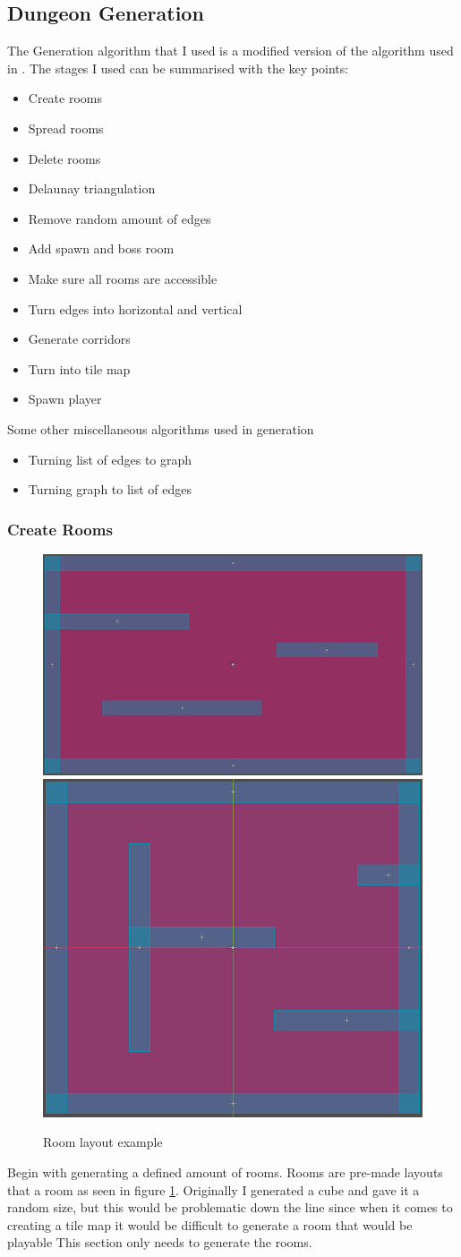 \documentclass{article}
\begin{document}
\subsection{Dungeon Generation}
The Generation algorithm that I used is a modified version of the algorithm used in {\cite{Gen_Alg}}. The stages I used can be summarised with the key points:
\begin{itemize}
\item{Create rooms}
\item{Spread rooms}
\item{Delete rooms}
\item{Delaunay triangulation}
\item{Remove random amount of edges}
\item{Add spawn and boss room}
\item{Make sure all rooms are accessible}
\item{Turn edges into horizontal and vertical}
\item{Generate corridors}
\item{Turn into tile map}
\item{Spawn player}
\end{itemize}
Some other miscellaneous algorithms used in generation
\begin{itemize}
\item{Turning list of edges to graph}
\item{Turning graph to list of edges}
\end{itemize}

\subsubsection{Create Rooms}
\begin{figure}[h]
\centering
\includegraphics[height = 0.2\textwidth]{room layout}
\includegraphics[height = 0.2\textwidth]{room layout1}
\caption{Room layout example}
\label{Room Layout}
\end{figure}
Begin with generating a defined amount of rooms. Rooms are pre-made layouts that a room as seen in figure \ref{Room Layout}. Originally I generated a cube and gave it a random size, but this would be problematic down the line since when it comes to creating a tile map it would be difficult to generate a room that would be playable \linebreak
This section only needs to generate the rooms.
\end{document}
